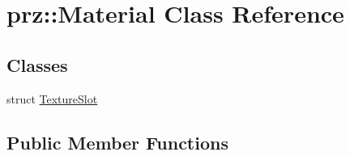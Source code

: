 \hypertarget{classprz_1_1_material}{}\section{prz\+::Material Class Reference}
\label{classprz_1_1_material}
\subsection*{Classes}
\begin{DoxyCompactItemize}
\item 
struct \mbox{\hyperlink{structprz_1_1_material_1_1_texture_slot}{Texture\+Slot}}
\end{DoxyCompactItemize}
\subsection*{Public Member Functions}

